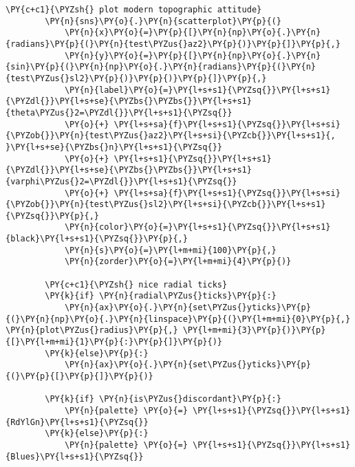 \begin{tcolorbox}[breakable, size=fbox, boxrule=1pt, pad at break*=1mm,colback=cellbackground, colframe=cellborder]
\begin{Verbatim}[commandchars=\\\{\}]
        \PY{c+c1}{\PYZsh{} plot modern topographic attitude}
        \PY{n}{sns}\PY{o}{.}\PY{n}{scatterplot}\PY{p}{(}
            \PY{n}{x}\PY{o}{=}\PY{p}{[}\PY{n}{np}\PY{o}{.}\PY{n}{radians}\PY{p}{(}\PY{n}{test\PYZus{}az2}\PY{p}{)}\PY{p}{]}\PY{p}{,}
            \PY{n}{y}\PY{o}{=}\PY{p}{[}\PY{n}{np}\PY{o}{.}\PY{n}{sin}\PY{p}{(}\PY{n}{np}\PY{o}{.}\PY{n}{radians}\PY{p}{(}\PY{n}{test\PYZus{}sl2}\PY{p}{)}\PY{p}{)}\PY{p}{]}\PY{p}{,}
            \PY{n}{label}\PY{o}{=}\PY{l+s+s1}{\PYZsq{}}\PY{l+s+s1}{\PYZdl{}}\PY{l+s+se}{\PYZbs{}\PYZbs{}}\PY{l+s+s1}{theta\PYZus{}2=\PYZdl{}}\PY{l+s+s1}{\PYZsq{}}
            \PY{o}{+} \PY{l+s+sa}{f}\PY{l+s+s1}{\PYZsq{}}\PY{l+s+si}{\PYZob{}}\PY{n}{test\PYZus{}az2}\PY{l+s+si}{\PYZcb{}}\PY{l+s+s1}{, }\PY{l+s+se}{\PYZbs{}n}\PY{l+s+s1}{\PYZsq{}}
            \PY{o}{+} \PY{l+s+s1}{\PYZsq{}}\PY{l+s+s1}{\PYZdl{}}\PY{l+s+se}{\PYZbs{}\PYZbs{}}\PY{l+s+s1}{varphi\PYZus{}2=\PYZdl{}}\PY{l+s+s1}{\PYZsq{}}
            \PY{o}{+} \PY{l+s+sa}{f}\PY{l+s+s1}{\PYZsq{}}\PY{l+s+si}{\PYZob{}}\PY{n}{test\PYZus{}sl2}\PY{l+s+si}{\PYZcb{}}\PY{l+s+s1}{\PYZsq{}}\PY{p}{,}
            \PY{n}{color}\PY{o}{=}\PY{l+s+s1}{\PYZsq{}}\PY{l+s+s1}{black}\PY{l+s+s1}{\PYZsq{}}\PY{p}{,}
            \PY{n}{s}\PY{o}{=}\PY{l+m+mi}{100}\PY{p}{,}
            \PY{n}{zorder}\PY{o}{=}\PY{l+m+mi}{4}\PY{p}{)}
    
        \PY{c+c1}{\PYZsh{} nice radial ticks}
        \PY{k}{if} \PY{n}{radial\PYZus{}ticks}\PY{p}{:}
            \PY{n}{ax}\PY{o}{.}\PY{n}{set\PYZus{}yticks}\PY{p}{(}\PY{n}{np}\PY{o}{.}\PY{n}{linspace}\PY{p}{(}\PY{l+m+mi}{0}\PY{p}{,} \PY{n}{plot\PYZus{}radius}\PY{p}{,} \PY{l+m+mi}{3}\PY{p}{)}\PY{p}{[}\PY{l+m+mi}{1}\PY{p}{:}\PY{p}{]}\PY{p}{)}
        \PY{k}{else}\PY{p}{:}
            \PY{n}{ax}\PY{o}{.}\PY{n}{set\PYZus{}yticks}\PY{p}{(}\PY{p}{[}\PY{p}{]}\PY{p}{)}
    
        \PY{k}{if} \PY{n}{is\PYZus{}discordant}\PY{p}{:}
            \PY{n}{palette} \PY{o}{=} \PY{l+s+s1}{\PYZsq{}}\PY{l+s+s1}{RdYlGn}\PY{l+s+s1}{\PYZsq{}}
        \PY{k}{else}\PY{p}{:}
            \PY{n}{palette} \PY{o}{=} \PY{l+s+s1}{\PYZsq{}}\PY{l+s+s1}{Blues}\PY{l+s+s1}{\PYZsq{}}
    

\end{Verbatim}
\end{tcolorbox}

